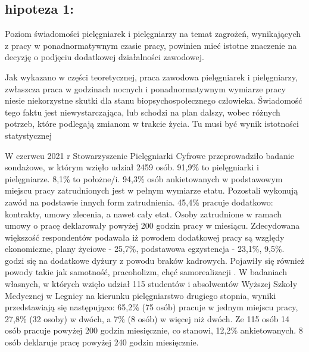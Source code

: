 \documentclass[a4paper,12pt,twoside,openany]{report}
\begin{document}
\subsection*{hipoteza 1:} 
Poziom świadomości pielęgniarek i pielęgniarzy na temat zagrożeń, wynikających z pracy w ponadnormatywnym czasie pracy, powinien mieć istotne znaczenie na decyzję o podjęciu dodatkowej działalności zawodowej. 

Jak wykazano w części teoretycznej, praca zawodowa pielęgniarek i pielęgniarzy, zwłaszcza praca w godzinach nocnych i ponadnormatywnym wymiarze pracy niesie niekorzystne skutki dla stanu biopsychospołecznego człowieka. Świadomość tego faktu jest niewystarczająca, lub schodzi na plan dalszy, wobec różnych potrzeb, które podlegają zmianom w trakcie życia. Tu musi być wynik istotności statystycznej

W czerwcu 2021 r Stowarzyszenie Pielęgniarki Cyfrowe przeprowadziło badanie sondażowe, w którym wzięło udział 2459 osób. 91,9\% to pielęgniarki i pielęgniarze. 8,1\% to położne/i.  94,3\%   osób ankietowanych w podstawowym miejscu pracy zatrudnionych jest w pełnym wymiarze etatu. Pozostali wykonują zawód na podstawie innych form zatrudnienia. 45,4\%  pracuje dodatkowo: kontrakty, umowy zlecenia, a nawet cały etat. Osoby zatrudnione w ramach umowy o pracę deklarowały powyżej 200 godzin pracy w miesiącu. Zdecydowana większość respondentów podawała iż powodem dodatkowej pracy są względy ekonomiczne, plany życiowe - 25,7\%,  podstawowa egzystencja -  23,1\%, 9,5\%. godzi się na dodatkowe dyżury z powodu braków kadrowych. Pojawiły się również powody takie jak samotność, pracoholizm, chęć samorealizacji \cite{cyfrowe}. W badaniach własnych, w których wzięło udział 115 studentów i absolwentów Wyższej Szkoły Medycznej  w Legnicy na kierunku pielęgniarstwo drugiego stopnia, wyniki  przedstawiają się następująco: 65,2\% (75 osób) pracuje w jednym miejscu pracy, 27,8\%  (32 osoby) w dwóch, a 7\%  (8 osób) w więcej niż dwóch.  Ze 115 osób 14 osób pracuje powyżej 200 godzin miesięcznie, co stanowi, 12,2\% ankietowanych. 8 osób deklaruje pracę powyżej  240 godzin miesięcznie.
\end{document}
